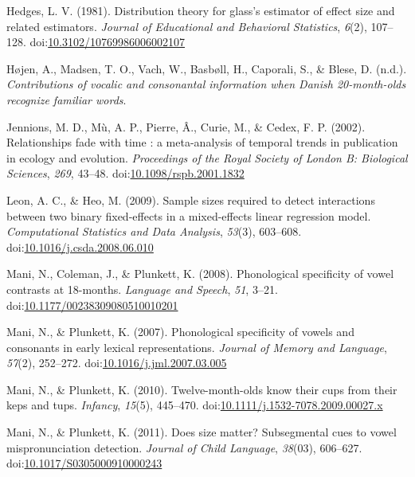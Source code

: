 \documentclass[
  man, noextraspace]{apa6}
\begin{document}
\leavevmode\hypertarget{ref-Hedges1981}{}%
Hedges, L. V. (1981). Distribution theory for glass's estimator of effect size and related estimators. \emph{Journal of Educational and Behavioral Statistics}, \emph{6}(2), 107--128. doi:\href{https://doi.org/10.3102/10769986006002107}{10.3102/10769986006002107}

\leavevmode\hypertarget{ref-Hojen}{}%
Højen, A., Madsen, T. O., Vach, W., Basbøll, H., Caporali, S., \& Blese, D. (n.d.). \emph{Contributions of vocalic and consonantal information when Danish 20-month-olds recognize familiar words}.

\leavevmode\hypertarget{ref-Jennions2002}{}%
Jennions, M. D., Mù, A. P., Pierre, Â., Curie, M., \& Cedex, F. P. (2002). Relationships fade with time : a meta-analysis of temporal trends in publication in ecology and evolution. \emph{Proceedings of the Royal Society of London B: Biological Sciences}, \emph{269}, 43--48. doi:\href{https://doi.org/10.1098/rspb.2001.1832}{10.1098/rspb.2001.1832}

\leavevmode\hypertarget{ref-Leon2009}{}%
Leon, A. C., \& Heo, M. (2009). Sample sizes required to detect interactions between two binary fixed-effects in a mixed-effects linear regression model. \emph{Computational Statistics and Data Analysis}, \emph{53}(3), 603--608. doi:\href{https://doi.org/10.1016/j.csda.2008.06.010}{10.1016/j.csda.2008.06.010}

\leavevmode\hypertarget{ref-Mani2008}{}%
Mani, N., Coleman, J., \& Plunkett, K. (2008). Phonological specificity of vowel contrasts at 18-months. \emph{Language and Speech}, \emph{51}, 3--21. doi:\href{https://doi.org/10.1177/00238309080510010201}{10.1177/00238309080510010201}

\leavevmode\hypertarget{ref-Mani2007}{}%
Mani, N., \& Plunkett, K. (2007). Phonological specificity of vowels and consonants in early lexical representations. \emph{Journal of Memory and Language}, \emph{57}(2), 252--272. doi:\href{https://doi.org/10.1016/j.jml.2007.03.005}{10.1016/j.jml.2007.03.005}

\leavevmode\hypertarget{ref-Mani2010kepstups}{}%
Mani, N., \& Plunkett, K. (2010). Twelve-month-olds know their cups from their keps and tups. \emph{Infancy}, \emph{15}(5), 445--470. doi:\href{https://doi.org/10.1111/j.1532-7078.2009.00027.x}{10.1111/j.1532-7078.2009.00027.x}

\leavevmode\hypertarget{ref-Mani2011}{}%
Mani, N., \& Plunkett, K. (2011). Does size matter? Subsegmental cues to vowel mispronunciation detection. \emph{Journal of Child Language}, \emph{38}(03), 606--627. doi:\href{https://doi.org/10.1017/S0305000910000243}{10.1017/S0305000910000243}
\end{document}
